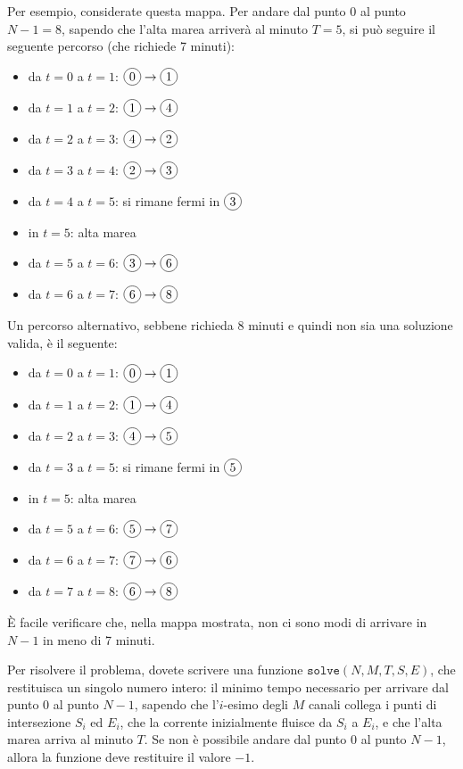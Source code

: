 \documentclass[a4paper,11pt]{article}
\newcommand*\circled[1]{\tikz[baseline=(char.base)]{
            \node[shape=circle,draw,inner sep=2pt] (char) {#1};}}
\begin{document}
Per esempio, considerate questa mappa. Per andare dal punto $0$
al punto $N-1 = 8$, sapendo che l'alta marea arriverà al minuto $T=5$,
si può seguire il seguente percorso (che richiede 7 minuti):
\begin{itemize}[nolistsep,noitemsep]
\item da $t=0$ a $t=1$: $\circled 0 \to \circled 1$
\item da $t=1$ a $t=2$: $\circled 1 \to \circled 4$
\item da $t=2$ a $t=3$: $\circled 4 \to \circled 2$
\item da $t=3$ a $t=4$: $\circled 2 \to \circled 3$
\item da $t=4$ a $t=5$: si rimane fermi in $\circled 3$
\item in $t=5$: alta marea
\item da $t=5$ a $t=6$: $\circled 3 \to \circled 6$
\item da $t=6$ a $t=7$: $\circled 6 \to \circled 8$
\end{itemize}

Un percorso alternativo, sebbene richieda 8 minuti e quindi non sia una soluzione valida, è il seguente:
\begin{itemize}[nolistsep,noitemsep]
\item da $t=0$ a $t=1$: $\circled 0 \to \circled 1$
\item da $t=1$ a $t=2$: $\circled 1 \to \circled 4$
\item da $t=2$ a $t=3$: $\circled 4 \to \circled 5$
\item da $t=3$ a $t=5$: si rimane fermi in $\circled 5$
\item in $t=5$: alta marea
\item da $t=5$ a $t=6$: $\circled 5 \to \circled 7$
\item da $t=6$ a $t=7$: $\circled 7 \to \circled 6$
\item da $t=7$ a $t=8$: $\circled 6 \to \circled 8$
\end{itemize}

\`E facile verificare che, nella mappa mostrata, non ci sono modi di
arrivare in $N-1$ in meno di 7 minuti.

Per risolvere il problema,
dovete scrivere una funzione $\texttt{solve} (N, M, T, S, E)$, che
restituisca un singolo numero intero: il minimo tempo necessario per
arrivare dal punto $0$ al punto $N-1$, sapendo che l'$i$-esimo degli
$M$ canali collega i punti di intersezione $S_i$ ed $E_i$, che la
corrente inizialmente fluisce da $S_i$ a $E_i$, e che l'alta marea
arriva al minuto $T$.  Se non è possibile andare dal punto $0$ al
punto $N-1$, allora la funzione deve restituire il valore $-1$.
\end{document}
